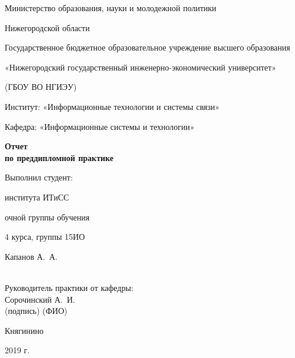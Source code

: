 \begin{titlepage}
\begin{center}
{ \normalsize \singlespacing Министерство образования, науки и молодежной политики 

Нижегородской области 

Государственное бюджетное образовательное учреждение высшего образования 

«Нижегородский государственный инженерно-экономический университет»

(ГБОУ ВО НГИЭУ)
\\[1mm]
}
\begin{flushleft}
\hfill \break
\normalsize{Институт: «Информационные технологии и системы связи»}

\normalsize{Кафедра: «Информационные системы и технологии»}\\[23mm]
\end{flushleft}

\textbf{\Large Отчет \\[1mm] по преддипломной практике\\[26mm]
}
\end{center}

\hfill
\begin{minipage}{.5\textwidth}
\begin{flushright}

Выполнил студент:

института ИТиСС 

очной группы обучения 

4 курса, группы 15ИО 

Капанов А.~А. 

\underline{\hspace{1in}}\\[5mm]

Руководитель практики от кафедры:\\[1mm] 
\underline{\hspace{3cm}}
\hspace{3mm}
Сорочинский А.~И.\\[-1.5pt]
(подпись) \hspace{3.5cm}
(ФИО)
\end{flushright}
\end{minipage}%
\vfill
\begin{center}
 Княгинино 
 
 2019 г.
\end{center}
\end{titlepage}